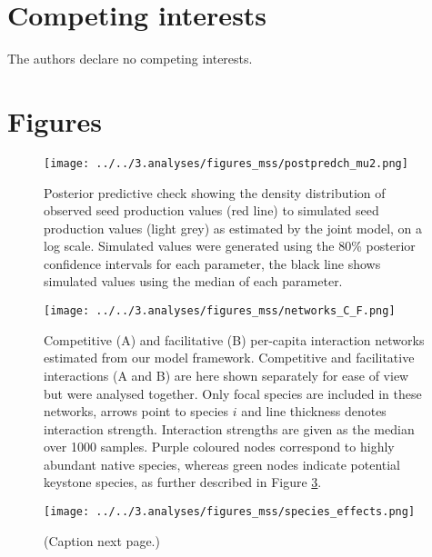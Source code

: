 \documentclass[a4,12pt]{article}
\begin{document}
\section*{Competing interests}

The authors declare no competing interests. 


\newpage

\printbibliography   

\newpage 

\section{Figures}


    \begin{figure}[H]
        \texttt{[image: ../../3.analyses/figures\_mss/postpredch\_mu2.png]}
        \caption{Posterior predictive check showing the density distribution of observed seed production values (red line) to simulated seed production values (light grey) as estimated by the joint model, on a log scale. Simulated values were generated using the 80\% posterior confidence intervals for each parameter, the black line shows simulated values using the median of each parameter. }
        \label{fig:ppcheckmu2}
    \end{figure}

    \begin{figure}[H]
        \begin{centering}
        \texttt{[image: ../../3.analyses/figures\_mss/networks\_C\_F.png]}
        \caption{Competitive (A) and facilitative (B) per-capita interaction networks estimated from our model framework. Competitive and facilitative interactions (A and B) are here shown separately for ease of view but were analysed together. Only focal species are included in these networks, arrows point to species $i$ and line thickness denotes interaction strength. Interaction strengths are given as the median over 1000 samples. Purple coloured nodes correspond to highly abundant native species, whereas green nodes indicate potential keystone species, as further described in Figure \ref{fig:species}.}
        \label{fig:netwks}
       \end{centering}
    \end{figure}  


    \begin{figure}[H]
        \begin{centering}
        \texttt{[image: ../../3.analyses/figures\_mss/species\_effects.png]}
        \caption{(Caption next page.)}
        \label{fig:species}
        \end{centering}
    \end{figure} 
\end{document}
